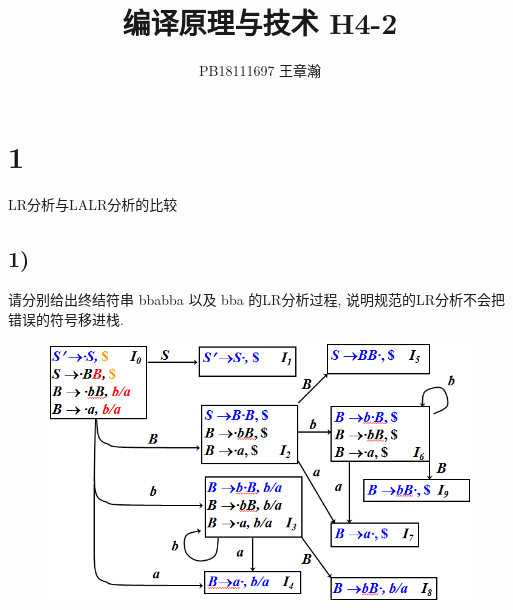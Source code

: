 \documentclass[UTF8]{article}
\title{编译原理与技术 H4-2}
\date{}
\author{PB18111697 王章瀚}
\begin{document}
\maketitle
\section*{1}
\noindent LR分析与LALR分析的比较
\subsection*{1)}
\noindent 请分别给出终结符串 bbabba 以及 bba 的LR分析过程, 说明规范的LR分析不会把错误的符号移进栈.
\begin{figure}[H]
	\centering
	\includegraphics[width=\linewidth/2]{1a.png}
\end{figure}\par
\end{document}
